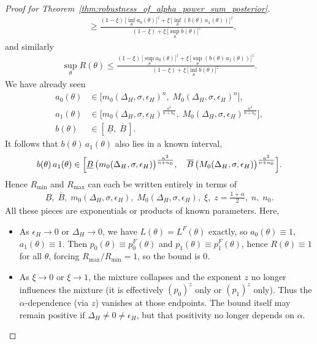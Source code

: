 \documentclass[12pt]{article}
\begin{document}
\begin{proof}[Proof for Theorem~\ref{thm:robustness_of_alpha_power_sum_posterior}]
\begin{align*}
        &\geq \frac{(1-\xi)\,\bigl[\inf_\theta a_0(\theta)\bigr]^z + \xi\,\bigl[\inf_\theta (b(\theta)\,a_1(\theta))\bigr]^z}{(1-\xi) + \xi\,\bigl[\sup_\theta b(\theta)\bigr]^z},
    \end{align*}
    and similarly
    \begin{align*}
        \sup_\theta R(\theta) \leq \frac{(1-\xi)\,\bigl[\sup_\theta a_0(\theta)\bigr]^z + \xi\,\bigl[\sup_\theta (b(\theta)\,a_1(\theta))\bigr]^z}{(1-\xi) + \xi\,\bigl[\inf_\theta b(\theta)\bigr]^z}.
    \end{align*}
    We have already seen
    \begin{align*}
        a_0(\theta) &\in \bigl[m_0(\Delta_H,\sigma,\epsilon_H)^n,\; M_0(\Delta_H,\sigma,\epsilon_H)^n \bigr], \\
        a_1(\theta) &\in \bigl[m_0(\Delta_H,\sigma,\epsilon_H)^{\frac{n^2}{n+n_0}},\; M_0(\Delta_H,\sigma,\epsilon_H)^{\frac{n^2}{n+n_0}}\bigr], \\
        b(\theta) &\in [\,\underline{B},\;\overline{B}\,].
    \end{align*}
    It follows that $b(\theta)\,a_1(\theta)$ also lies in a known interval,
    \begin{align*}
        b(\theta)\,a_1(\theta) \in \Bigl[\underline{B}\,\bigl(m_0(\Delta_H,\sigma,\epsilon_H)\bigr)^{\frac{n^2}{n+n_0}}, \quad \overline{B}\,\bigl(M_0(\Delta_H,\sigma,\epsilon_H)\bigr)^{\frac{n^2}{n+n_0}}\Bigr].
    \end{align*}
    Hence $R_{\min}$ and $R_{\max}$ can each be written entirely in terms of
    \begin{align*}
        \underline{B},\;\overline{B},\; m_0(\Delta_H,\sigma,\epsilon_H),\;M_0(\Delta_H,\sigma,\epsilon_H),\;\xi,\;z=\frac{1+\alpha}{2},\;n,\;n_0.
    \end{align*}
    All these pieces are exponentials or products of known parameters.
    Here,
    \begin{itemize}
        \item As $\epsilon_H\to0$ or $\Delta_H\to0$, we have $L(\theta)=L^F(\theta)$ exactly, so $a_0(\theta)\equiv1$, $a_1(\theta)\equiv1$.  Then $p_0(\theta)\equiv p_0^F(\theta)$ and $p_1(\theta)\equiv p_1^F(\theta)$, hence $R(\theta)\equiv1$ for all $\theta$, forcing $R_{\max}/R_{\min}=1$, so the bound is 0.
        \item As $\xi\to0$ or $\xi\to1$, the mixture collapses and the exponent $z$ no longer influences the mixture (it is effectively $(p_0)^z$ only or $(p_1)^z$ only). Thus the $\alpha$‐dependence (via $z$) vanishes at those endpoints.  The bound itself may remain positive if $\Delta_H\neq0\neq\epsilon_H$, but that positivity no longer depends on $\alpha$.

\end{itemize}
\end{proof}
\end{document}
